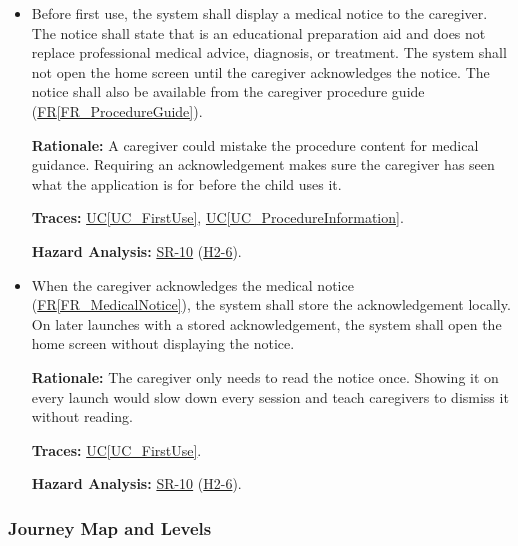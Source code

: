 \documentclass[12pt]{article}
\newcommand{\ucref}[1]{\hyperref[#1]{UC\ref*{#1}}}
\newcounter{reqnum} %
\newcommand{\rref}[1]{\hyperref[#1]{FR\ref*{#1}}}
\newcommand{\haurl}{https://team-hindsight.github.io/ophthamology-game/HazardAnalysis/HazardAnalysis.pdf}
\newcommand{\hasrref}[2]{\href{\haurl\#nameddest=sr:#1}{SR-#2}}
\newcommand{\hahazref}[2]{\href{\haurl\#nameddest=haz:#1}{H#2}}
\newcommand{\hazsr}[4]{\hasrref{#1}{#2} (\hahazref{#3}{#4})}
\begin{document}
\begin{itemize}

\item[\refstepcounter{reqnum}\textbf{FR\thereqnum}\label{FR_MedicalNotice}:]
Before first use, the system shall display a medical notice to the
caregiver. The notice shall state that \progname{} is an educational
preparation aid and does not replace professional medical advice, diagnosis,
or treatment. The system shall not open the home screen until the caregiver
acknowledges the notice. The notice shall also be available from the caregiver
procedure guide (\rref{FR_ProcedureGuide}).

\textbf{Rationale:} A caregiver could mistake the procedure content for medical guidance.
Requiring an acknowledgement makes sure the caregiver has seen what the
application is for before the child uses it.

\textbf{Traces:} \ucref{UC_FirstUse}, \ucref{UC_ProcedureInformation}.

\textbf{Hazard Analysis:} \hazsr{MedicalDisclaimer}{10}{MisinterpretedMedicalPurpose}{2-6}.

\item[\refstepcounter{reqnum}\textbf{FR\thereqnum}\label{FR_RecordAck}:]
When the caregiver acknowledges the medical notice
(\rref{FR_MedicalNotice}), the system shall store the acknowledgement
locally. On later launches
with a stored acknowledgement, the system shall open the home screen without
displaying the notice.

\textbf{Rationale:} The caregiver only needs to read the notice once. Showing
it on every launch would slow down every session and teach caregivers to
dismiss it without reading.

\textbf{Traces:} \ucref{UC_FirstUse}.

\textbf{Hazard Analysis:} \hazsr{MedicalDisclaimer}{10}{MisinterpretedMedicalPurpose}{2-6}.

\end{itemize}

\subsubsection{Journey Map and Levels}
\label{sec_FRJourney}
\end{document}
